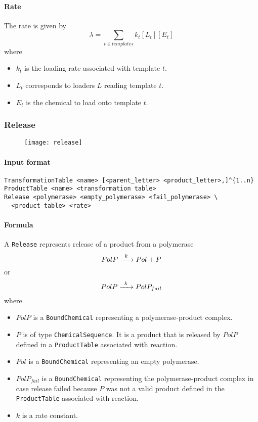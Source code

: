 \paragraph{Rate} The rate is given by
\[
	\lambda = \sum_{t\in templates} k_t[L_t][E_t]
\]
where
\begin{itemize}
	\item $k_t$ is the loading rate associated with template $t$.
	\item $L_t$ corresponds to loaders $L$ reading template $t$.
	\item $E_t$ is the chemical to load onto template $t$.
\end{itemize}

\subsubsection{Release}

\begin{figure}[!ht]
	\centering
	\texttt{[image: release]}
\end{figure}

\paragraph{Input format}
\begin{verbatim}
TransformationTable <name> [<parent_letter> <product_letter>,]^{1..n}
ProductTable <name> <transformation table>
Release <polymerase> <empty_polymerase> <fail_polymerase> \
  <product table> <rate>
\end{verbatim}

\paragraph{Formula} A \texttt{Release} represents release of a product from a polymerase
\[
	\reactionIrr{PolP}{Pol + P}{k}{}
\]
or 
\[
	\reactionIrr{PolP}{PolP_{fail}}{k}{}
\]
where
\begin{itemize}
	\item $PolP$ is a \texttt{BoundChemical} representing a polymerase-product complex.
	\item $P$ is of type \texttt{ChemicalSequence}. It is a product that is released by $PolP$ defined in a \texttt{ProductTable} associated with reaction.
	\item $Pol$ is a \texttt{BoundChemical} representing an empty polymerase.
	\item $PolP_{fail}$ is a \texttt{BoundChemical} representing the polymerase-product complex in case release failed because $P$ was not a valid product defined in the \texttt{ProductTable} associated with reaction.
	\item $k$ is a rate constant.
\end{itemize}

